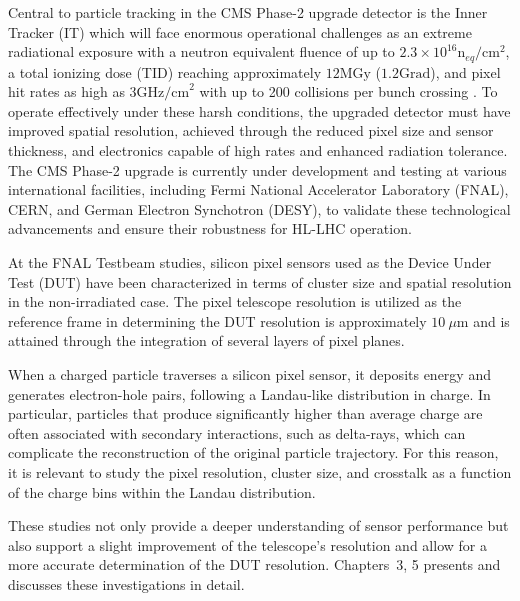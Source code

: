 Central to particle tracking in the CMS Phase-2 upgrade detector is the Inner Tracker (IT) which will face enormous operational challenges as an extreme radiational exposure with a neutron equivalent fluence of up to $2.3 \times 10^{16}\text{n}_{eq}/\text{cm}^{2}$, a total ionizing dose (TID) reaching approximately $12\text{MGy}$ ($1.2 \text{Grad}$), and pixel hit rates as high as $3\text{GHz/cm}^{2}$ with up to 200 collisions per bunch crossing \cite{Apollinari:2284929, Malik:2816244}. To operate effectively under these harsh conditions, the upgraded detector must have improved spatial resolution, achieved through the reduced pixel size and sensor thickness, and electronics capable of high rates and enhanced radiation tolerance. The CMS Phase-2 upgrade is currently under development and testing at various international facilities, including Fermi National Accelerator Laboratory (FNAL), CERN, and German Electron Synchotron (DESY), to validate these technological advancements and ensure their robustness for HL-LHC operation.

At the FNAL Testbeam studies, silicon pixel sensors used as the Device Under Test (DUT) have been characterized in terms of cluster size and spatial resolution in the non-irradiated case. The pixel telescope resolution is utilized as the reference frame in determining the DUT resolution is approximately $10~\mu\text{m}$ and is attained through the integration of several layers of pixel planes.

When a charged particle traverses a silicon pixel sensor, it deposits energy and generates electron-hole pairs, following a Landau-like distribution in charge. In particular, particles that produce significantly higher than average charge are often associated with secondary interactions, such as delta-rays, which can complicate the reconstruction of the original particle trajectory. For this reason, it is relevant to study the pixel resolution, cluster size, and crosstalk as a function of the charge bins within the Landau distribution.

These studies not only provide a deeper understanding of sensor performance but also support a slight improvement of the telescope's resolution and allow for a more accurate determination of the DUT resolution. Chapters~3, 5 presents and discusses these investigations in detail.

